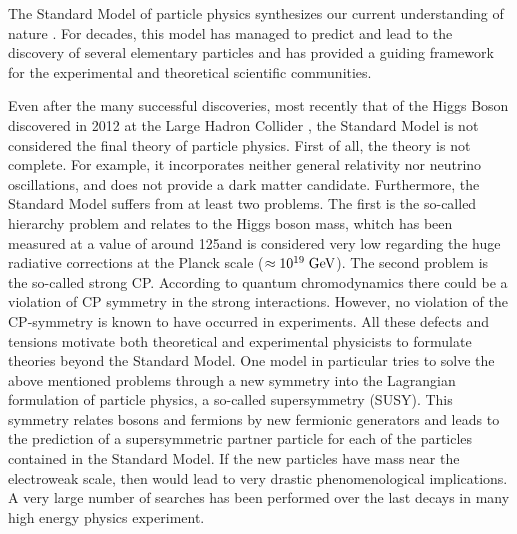 The Standard Model of particle physics synthesizes our current understanding of nature \cite{Spiesberger:2000ks}. For decades, this model has managed to predict and lead to the discovery of several elementary particles and has provided a guiding framework for the experimental and theoretical scientific communities. 

Even after the many successful discoveries, most recently that of the Higgs Boson discovered in 2012 at the Large Hadron Collider \cite{Aad:2012tfa,Chatrchyan:2012xdj}, the Standard Model is not considered the final theory of particle physics. First of all, the theory is not complete. For example, it incorporates neither general relativity nor neutrino oscillations, and does not provide a dark matter candidate. Furthermore, the Standard Model suffers from at least two problems. The first is the so-called hierarchy problem and relates to the Higgs boson mass, whitch has been measured at a value of around 125\gev and is considered very low regarding the huge radiative corrections at the Planck scale ($\approx 10^{19}\;\text{Ge}\kern-0.06667em\text{V}$). The second problem is the so-called strong CP. According to quantum chromodynamics there could be a violation of CP symmetry in the strong interactions. However, no violation of the CP-symmetry is known to have occurred in experiments. All these defects and tensions motivate both theoretical and experimental physicists to formulate theories beyond the Standard Model. One model in particular tries to solve the above mentioned problems through a new symmetry into the Lagrangian formulation of particle physics, a so-called supersymmetry (SUSY). This symmetry relates bosons and fermions by new fermionic generators and leads to the prediction of a supersymmetric partner particle for each of the particles contained in the Standard Model. If the new particles have mass near the electroweak scale, then would lead to very drastic phenomenological implications. A very large number of searches has been performed over the last decays in many high energy physics experiment. 

